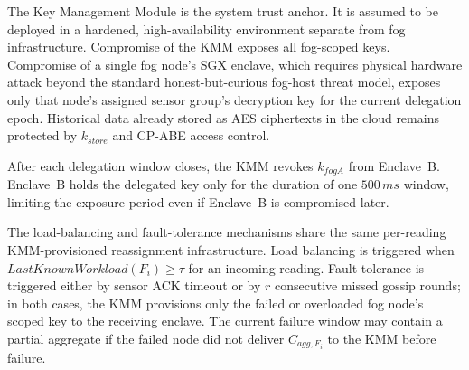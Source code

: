 \documentclass[conference]{IEEEtran}
\begin{document}
    \begin{table}[htbp]
    \caption{Compromise Blast Radius Across Key-Provisioning Designs}
    \label{table:trust-model}
    \centering
    \end{table}

    The Key Management Module is the system trust anchor. It is assumed to be deployed in a hardened, high-availability environment separate from fog infrastructure. Compromise of the KMM exposes all fog-scoped keys. Compromise of a single fog node's SGX enclave, which requires physical hardware attack beyond the standard honest-but-curious fog-host threat model, exposes only that node's assigned sensor group's decryption key for the current delegation epoch. Historical data already stored as AES ciphertexts in the cloud remains protected by $k_{store}$ and CP-ABE access control.

    After each delegation window closes, the KMM revokes $k_{fogA}$ from Enclave~B. Enclave~B holds the delegated key only for the duration of one $500\,ms$ window, limiting the exposure period even if Enclave~B is compromised later.

    The load-balancing and fault-tolerance mechanisms share the same per-reading KMM-provisioned reassignment infrastructure. Load balancing is triggered when $LastKnownWorkload(F_i) \geq \tau$ for an incoming reading. Fault tolerance is triggered either by sensor ACK timeout or by $r$ consecutive missed gossip rounds; in both cases, the KMM provisions only the failed or overloaded fog node's scoped key to the receiving enclave. The current failure window may contain a partial aggregate if the failed node did not deliver $C_{agg,F_i}$ to the KMM before failure.
\end{document}
